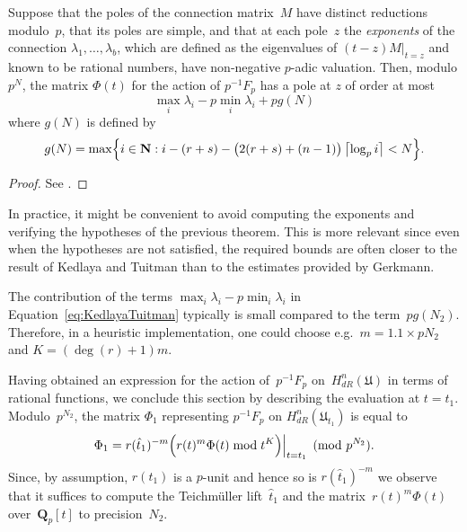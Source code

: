 \begin{thm} \label{thm:KedlayaTuitman}
Suppose that the poles of the connection matrix~$M$ have distinct 
reductions modulo~$p$, that its poles are simple, and that at each 
pole~$z$ the \emph{exponents} of the connection $\lambda_1, \dotsc, \lambda_b$,
which are defined as the eigenvalues of $(t-z) M \vert_{t=z}$ and known to be 
rational numbers, have non-negative $p$-adic valuation.  Then, modulo $p^N$, 
the matrix $\Phi(t)$ for the action of $p^{-1} F_p$ has a pole at $z$ of order 
at most 
\begin{equation} \label{eq:KedlayaTuitman}
\max_{i} \lambda_i - p \min_{i} \lambda_i + p g(N)
\end{equation}
where $g(N)$ is defined by 
\begin{equation}
g(N) = \max\Bigl\{ i \in \mathbf{N} : i - (r+s) - \bigl(2(r+s) + (n-1)\bigr) \left\lceil\log_p i\right\rceil < N \Bigr\}.
\end{equation}
\end{thm}

\begin{proof}
See \citep[Theorem~2.1]{KedlayaTuitman2012}.
\end{proof}

\begin{rem} \label{rem:KedlayaTuitman}
In practice, it might be convenient to avoid computing the exponents and 
verifying the hypotheses of the previous theorem.  This is more relevant 
since even when the hypotheses are not satisfied, the required bounds are 
often closer to the result of Kedlaya and Tuitman than to the estimates 
provided by Gerkmann.

The contribution of the terms $\max_i \lambda_i - p \min_i \lambda_i$ 
in Equation~\eqref{eq:KedlayaTuitman} typically is small compared to the 
term~$p g(N_2)$. Therefore, in a heuristic implementation, one 
could choose e.g.\ $m = 1.1 \times p N_2$ and $K = (\deg(r) + 1) m$.
\end{rem}

Having obtained an expression for the action of~$p^{-1} F_p$ 
on~$H_{dR}^{n}(\mathfrak{U})$ in terms of rational functions, we conclude 
this section by describing the evaluation at $t = t_1$.  Modulo~$p^{N_2}$, 
the matrix $\Phi_1$ representing $p^{-1} F_p$ on 
$H_{dR}^{n}(\mathfrak{U}_{t_1})$ is equal to 
\begin{equation}
\Phi_1 = 
    r(\hat{t}_1)^{-m} 
    \Bigl( r(t)^m \Phi(t) \bmod{t^K} \Bigr) \Big\vert_{t=t_1} \pmod{p^{N_2}}.
\end{equation}
Since, by assumption, $r(t_1)$ is a $p$-unit and hence so is 
$r(\hat{t}_1)^{-m}$ we observe that it suffices to compute the 
Teichm\"uller lift~$\hat{t}_1$ and the matrix~$r(t)^m \Phi(t)$ 
over~$\mathbf{Q}_p[t]$ to precision~$N_2$.

